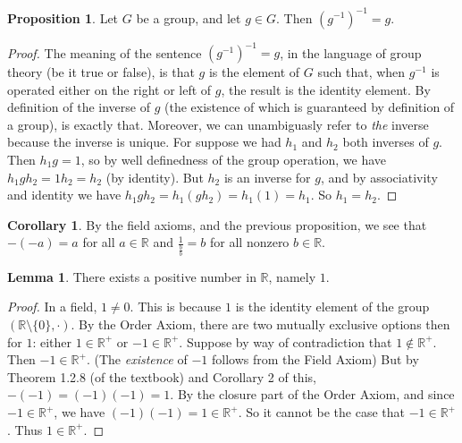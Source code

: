 \documentclass[11pt]{article}
\newcommand{\R}{\mathbb{R}}
\newcommand{\inv}[1]{{#1}^{-1}}
\theoremstyle{definition}
\newtheorem{corollary}{Corollary}
\newtheorem{proposition}{Proposition}
\newtheorem{lemma}{Lemma}
\begin{document}
\begin{proposition}
Let $G$ be a group, and let $g\in G$. Then $\inv{(\inv{g})} = g$. 
\end{proposition} 
\begin{proof}
The meaning of the sentence $ \inv{(\inv{g})} = g$, in the language of group theory (be it true or false), is that $g$ is the element of $G$ such that, when $\inv{g}$ is operated either on the right or left of $g$, the result is the identity element. By definition of the inverse of $g$ (the existence of which is guaranteed by definition of a group), is exactly that. Moreover, we can unambiguasly refer to \textit{the} inverse because the inverse is unique. For suppose we had $h_1$ and $h_2$ both inverses of $g$. Then $h_1g = 1$, so by well definedness of the group operation, we have $h_1gh_2 = 1h_2 = h_2$ (by identity). But $h_2$ is an inverse for $g$, and by associativity and identity we have $h_1 g h_2 = h_1(gh_2) = h_1(1) = h_1$. So $h_1  = h_2$.
\end{proof}
 
 \begin{corollary}
 By the field axioms, and the previous proposition, we see that $-(-a) = a$ for all $a\in \R$ and $\frac{1}{\frac{b}{b}} = b$ for all nonzero $b\in \R$. 
 \end{corollary}
 
 
 \begin{lemma}
 There exists a positive number in $\R$, namely $1$.
 \end{lemma}
 
 \begin{proof}
 In a field, $1\ne 0$. This is because $1$ is the identity element of the group $(\R\setminus \{0\}, \cdot)$. By the Order Axiom, there are two mutually exclusive options then for $1$: either $1\in \R^+$ or $-1 \in \R^+$. Suppose by way of contradiction that $1\not\in \R^+$. Then $-1\in \R^+$. (The \textit{existence} of $-1$ follows from the Field Axiom) But by Theorem 1.2.8 (of the textbook) and Corollary 2 of this, $-(-1) = (-1)(-1) = 1$. By the closure part of the Order Axiom, and since $-1\in \R^+$, we have $(-1)(-1) = 1\in \R^+$. So it cannot be the case that $-1 \in \R^+$. Thus $1\in \R^+$.
 \end{proof}
 
\end{document}
